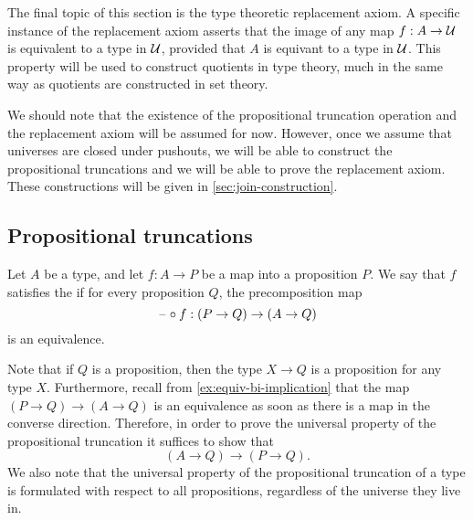 The final topic of this section is the type theoretic replacement axiom. A specific instance of the replacement axiom asserts that the image of any map $f:A\to\mathcal{U}$ is equivalent to a type in $\mathcal{U}$, provided that $A$ is equivant to a type in $\mathcal{U}$. This property will be used to construct quotients in type theory, much in the same way as quotients are constructed in set theory.

We should note that the existence of the propositional truncation operation and the replacement axiom will be assumed for now. However, once we assume that universes are closed under pushouts, we will be able to construct the propositional truncations and we will be able to prove the replacement axiom. These constructions will be given in \cref{sec:join-construction}.

\subsection{Propositional truncations}\label{sec:propositional-truncation-up}

\begin{defn}
Let $A$ be a type, and let $f:A\to P$ be a map into a proposition $P$. We say that $f$ satisfies the  if for every proposition $Q$, the precomposition map
\begin{equation*}
\mathord{\hspace{1pt}\text{--}\hspace{1pt}}\circ f:(P\to Q)\to (A\to Q)
\end{equation*}
is an equivalence.
\end{defn}

\begin{rmk}
  Note that if $Q$ is a proposition, then the type $X\to Q$ is a proposition for any type $X$. Furthermore, recall from \cref{ex:equiv-bi-implication} that the map $(P\to Q)\to (A\to Q)$ is an equivalence as soon as there is a map in the converse direction. Therefore, in order to prove the universal property of the propositional truncation it suffices to show that
  \begin{equation*}
    (A\to Q)\to (P\to Q).
  \end{equation*}
  We also note that the universal property of the propositional truncation of a type is formulated with respect to all propositions, regardless of the universe they live in. 
\end{rmk}

